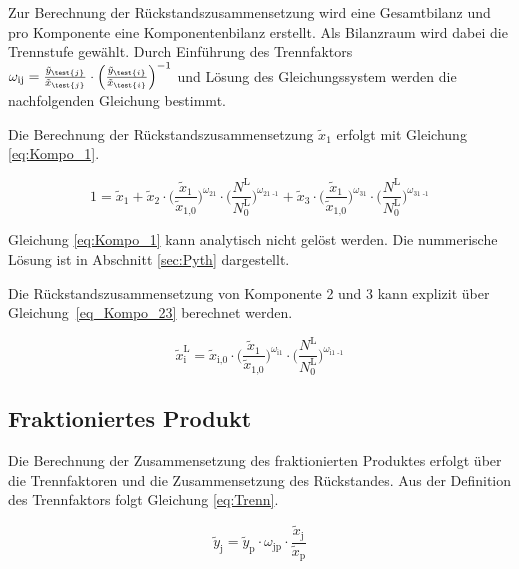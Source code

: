 Zur Berechnung der Rückstandszusammensetzung wird eine Gesamtbilanz und pro Komponente eine Komponentenbilanz erstellt. Als Bilanzraum wird dabei die Trennstufe gewählt. Durch Einführung des Trennfaktors $\omega_{\text{ij}} = \frac{\tilde y_{\test{j}}}{\tilde x_{\test{j}}} \cdot \Big( \frac{\tilde y_{\test{i}}}{\tilde x_{\test{i}}} \Big) ^{-1}$ und Lösung des Gleichungssystem werden die nachfolgenden Gleichung bestimmt.

\noindent Die Berechnung der Rückstandszusammensetzung $\tilde x_1$ erfolgt mit Gleichung \ref{eq:Kompo_1}.

\begin{equation}
    1 = \tilde x_{\text{1}} + \tilde x_{\text{2}} \cdot \Big( \frac{\tilde x_{\text{1}}}{\tilde x_{\text{1,0}}} \Big) ^{\omega_{\text{21}}} \cdot \Big( \frac{N^{\text{L}}}{N_{0}^{\text{L}}} \Big) ^{\omega_{\text{21 -1}}} + \tilde x_{\text{3}} \cdot \Big( \frac{\tilde x_{\text{1}}}{\tilde x_{\text{1,0}}} \Big) ^{\omega_{\text{31}}} \cdot \Big( \frac{N^{\text{L}}}{N_{0}^{\text{L}}} \Big) ^{\omega_{\text{31 -1}}}
    \label{eq:Kompo_1}
\end{equation}

\noindent Gleichung \ref{eq:Kompo_1} kann analytisch nicht gelöst werden. Die nummerische Lösung ist in Abschnitt \ref{sec:Pyth} dargestellt.

\noindent Die Rückstandszusammensetzung von Komponente 2 und 3 kann explizit über Gleichung~\ref{eq_Kompo_23} berechnet werden.

\begin{equation}
    \tilde x_{\text{i}}^{\text{L}} = \tilde x_{\text{i,0}} \cdot \Big( \frac{\tilde x_{\text{1}}}{\tilde x_{\text{1,0}}} \Big) ^{\omega_{\text{i1}}} \cdot \Big( \frac{N^{\text{L}}}{N_{0}^{\text{L}}} \Big) ^{\omega_{\text{i1 -1}}}
    \label{eq_Kompo_23}
\end{equation}

\subsection{Fraktioniertes Produkt}
Die Berechnung der Zusammensetzung des fraktionierten Produktes erfolgt über die Trennfaktoren und die Zusammensetzung des Rückstandes. Aus der Definition des Trennfaktors folgt Gleichung \ref{eq:Trenn}.

\begin{equation}
    \tilde y_{\text{j}} = \tilde y_{\text{p}} \cdot \omega_{\text{jp}} \cdot \frac{\tilde x_{\text{j}}}{\tilde x_{\text{p}}}
    \label{eq:Trenn}
\end{equation}

